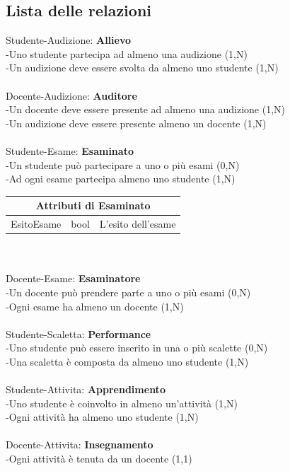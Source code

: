 \documentclass[11pt]{article}
\begin{document}
	\subsection{Lista delle relazioni}
		Studente-Audizione: \textbf{Allievo}\\
		-Uno studente partecipa ad almeno una audizione (1,N)\\
		-Un audizione deve essere svolta da almeno uno studente (1,N)\\
		\\
		Docente-Audizione: \textbf{Auditore}\\
		-Un docente deve essere presente ad almeno una audizione (1,N)\\
		-Un audizione deve essere presente almeno un docente (1,N)\\
		\\
		Studente-Esame: \textbf{Esaminato}\\
		-Un studente può partecipare a uno o più esami (0,N)\\
		-Ad ogni esame partecipa almeno uno studente (1,N)\\
		\begin{tabular}{|c|c|c|}
			\hline
			\multicolumn{3}{|c|}{Attributi di \textbf{Esaminato}}\\
			\hline
			EsitoEsame & bool & L'esito dell'esame\\
			\hline
		\end{tabular}
		\\\\
		Docente-Esame: \textbf{Esaminatore}\\
		-Un docente può prendere parte a uno o più esami (0,N)\\
		-Ogni esame ha almeno un docente (1,N)\\
		\\
		Studente-Scaletta: \textbf{Performance}\\
		-Uno studente può essere inserito in una o più scalette (0,N)\\
		-Una scaletta è composta da almeno uno studente (1,N)\\
		\\
		Studente-Attivita: \textbf{Apprendimento}\\
		-Uno studente è coinvolto in almeno un'attività (1,N)\\
		-Ogni attività ha almeno uno studente (1,N)\\
		\\
		Docente-Attivita: \textbf{Insegnamento}\\
		-Ogni attività è tenuta da un docente (1,1)\\
\end{document}
